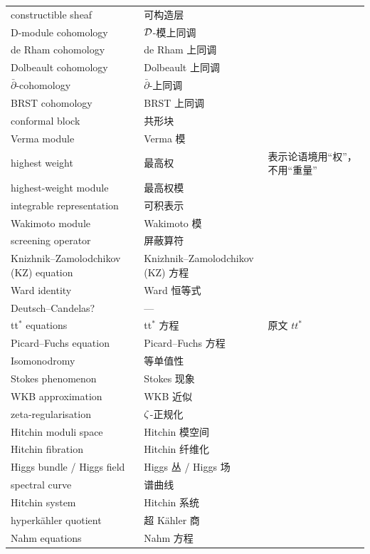 \begin{longtable}{@{}p{}p{}p{}@{}}
constructible sheaf         & 可构造层            & \\
D-module cohomology         & $\mathcal{D}$-模上同调      & \\
de Rham cohomology          & de Rham 上同调      & \\
Dolbeault cohomology        & Dolbeault 上同调    & \\
$\bar\partial$-cohomology   & $\bar\partial$-上同调 & \\
BRST cohomology             & BRST 上同调         & \\
conformal block             & 共形块              & \\
Verma module                & Verma 模            & \\
highest weight              & 最高权              & 表示论语境用“权”，不用“重量” \\
highest-weight module       & 最高权模            & \\
integrable representation   & 可积表示            & \\
Wakimoto module             & Wakimoto 模         & \\
screening operator          & 屏蔽算符            & \\
Knizhnik--Zamolodchikov (KZ) equation & Knizhnik--Zamolodchikov (KZ) 方程 & \\
Ward identity               & Ward 恒等式         & \\
Deutsch--Candelas?          & ---                 & \\
tt$^*$ equations            & tt$^*$ 方程         & 原文 $tt^*$ \\
Picard--Fuchs equation      & Picard--Fuchs 方程  & \\
Isomonodromy               & 等单值性            & \\
Stokes phenomenon           & Stokes 现象         & \\
WKB approximation           & WKB 近似            & \\
zeta-regularisation         & $\zeta$-正规化        & \\
Hitchin moduli space        & Hitchin 模空间      & \\
Hitchin fibration           & Hitchin 纤维化      & \\
Higgs bundle / Higgs field  & Higgs 丛 / Higgs 场 & \\
spectral curve              & 谱曲线              & \\
Hitchin system              & Hitchin 系统        & \\
hyperk\"ahler quotient      & 超 K\"ahler 商      & \\
Nahm equations              & Nahm 方程           & \\
\end{longtable}
